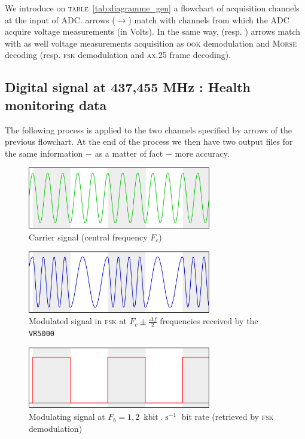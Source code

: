 \documentclass[twocolumn,pre,floats,aps,amsmath,amssymb]{revtex4}
\newenvironment{remark}[1][Remarque.]{\begin{trivlist}
\item[\hskip \labelsep {\bfseries #1}]}{\end{trivlist}}
\begin{document}
\begin{remark}
  We introduce on \textsc{table}~\ref{tab:diagramme_gen} a flowchart of acquisition channels at the input of ADC. { \color{oneblue}{Blue} } arrows ($\rightarrow$) match with channels from which the ADC acquire voltage measurements (in Volts). In the same way, { \color{rltgreen}{green} } (resp. { \color{rltred}{red} }) arrows match with as well voltage measurements acquisition as \textsc{ook} demodulation and \textsc{Morse} decoding (resp. \textsc{fsk} demodulation and \textsc{ax.25} frame decoding).
\end{remark}

\subsection{Digital signal at 437,455 MHz : Health monitoring data}

The following process is applied to the two channels specified by { \color{rltred}{red} } arrows of the previous flowchart. At the end of the process we then have two output files for the same information $-$ as a matter of fact $-$ more accuracy.

\begin{figure}[h]
  \includegraphics[width=8cm]{pictures/porteuse.png}
  \caption{Carrier signal (central frequency $F_c$)}
  \label{fig:signal_porteur}
\end{figure}

\begin{figure}[h]
  \includegraphics[width=8cm]{pictures/signal_mod.png}
  \caption{Modulated signal in \textsc{fsk} at $F_c \pm \frac{\Delta f}{2}$ frequencies received by the \texttt{VR5000}}
  \label{fig:signal_module}
\end{figure}

\begin{figure}[h]
  \includegraphics[width=8cm]{pictures/signal_demod.png}
  \caption{Modulating signal at $F_b = 1,2 \ \operatorname{kbit}.\operatorname{s}^{-1}$ bit rate (retrieved by \textsc{fsk} demodulation)}
  \label{fig:signal_modulant}
\end{figure}
\end{document}
